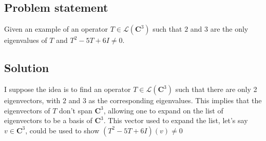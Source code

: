 \documentclass{article}
\begin{document}
\subsection*{Problem statement}
Given an example of an operator $T\in\mathcal{L}(\mathbf{C}^3)$ such that $2$ and $3$ are the only eigenvalues of $T$ and $T^2-5T+6I\neq 0$.

\subsection*{Solution}
I suppose the idea is to find an operator $T\in\mathcal{L}(\mathbf{C}^3)$ such that there are only 2 eigenvectors, with $2$ and $3$ as the corresponding eigenvalues. This implies that the eigenvectors of $T$ don't span $\mathbf{C}^3$, allowing one to expand on the list of eigenvectors to be a basis of $\mathbf{C}^3$. This vector used to expand the list, let's say $v\in \mathbf{C}^3$, could be used to show $(T^2-5T+6I)(v)\neq 0$
\end{document}
